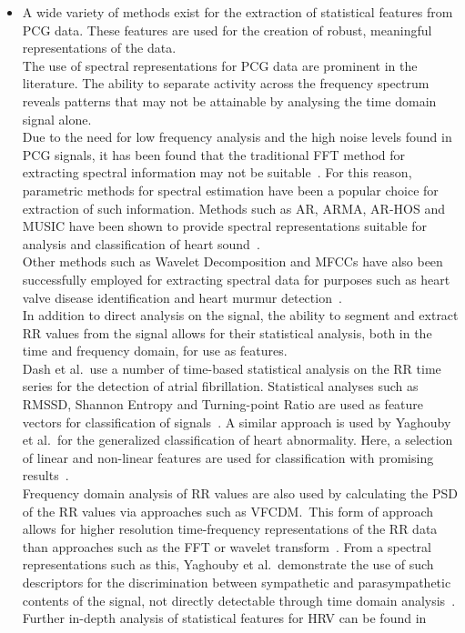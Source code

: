 \documentclass[titlepage]{scrartcl}
\begin{document}
\begin{itemize}
    \item A wide variety of methods exist for the extraction of statistical
        features from PCG data. These features are used for the creation of
        robust, meaningful representations of the data.\\
        The use of spectral representations for PCG data are prominent in the
        literature. The ability to separate activity across the frequency
        spectrum reveals patterns that may not be attainable by analysing the
        time domain signal alone.\\
        Due to the need for low frequency analysis and the high noise levels
        found in PCG signals, it has been found that the traditional FFT
        method for extracting spectral information may not be
        suitable~\parencite{Akay1990}. For this reason, parametric methods for
        spectral estimation have been a popular choice for extraction of such information. 
        Methods such as AR, ARMA, AR-HOS and MUSIC have been shown to provide spectral
        representations suitable for analysis and classification of heart
        sound~\parencite{Ergen2001, Schmidt2015}.\\
        Other methods such as Wavelet Decomposition and MFCCs have also been
        successfully  employed for extracting spectral data for purposes such
        as heart valve disease identification and heart murmur
        detection~\parencite{Quiceno-Manrique2010a, Maglogiannis2009}.\\
        
        In addition to direct analysis on the signal, the ability to segment
        and extract RR values from the signal allows for their statistical
        analysis, both in the time and frequency domain, for use as features.\\
        Dash et al.\ use a number of time-based statistical analysis on the RR
        time series for the detection of atrial fibrillation. Statistical
        analyses such as RMSSD, Shannon Entropy and Turning-point Ratio are
        used as feature vectors for classification of
        signals~\citeyearpar{Dash2009}.  A similar approach is used by Yaghouby
        et al.\ for the generalized classification of heart abnormality. Here,
        a selection of linear and non-linear features are used for
        classification with promising results~\citeyearpar{Yaghouby2009}.\\
        Frequency domain analysis of RR values are also used by calculating the
        PSD of the RR values via  approaches such as VFCDM.\ This form of
        approach allows for higher resolution time-frequency representations of
        the RR data than approaches such as the FFT or wavelet transform~\parencite{Wang2006}.
        From a spectral representations such as this, Yaghouby et al.\
        demonstrate the use of such descriptors for the discrimination between
        sympathetic and parasympathetic contents of the signal, not directly
        detectable through time domain analysis~\citeyearpar{Yaghouby2009}.\\
        Further in-depth analysis of statistical features for HRV can be found
        in~\parencite{Electrophysiology1996}


\end{itemize}
\end{document}
